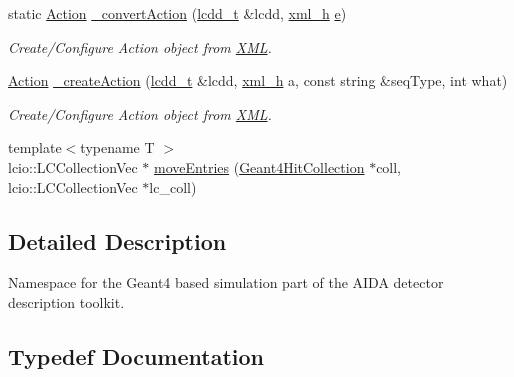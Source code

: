 \begin{DoxyCompactItemize}
static \hyperlink{namespace_d_d4hep_1_1_simulation_1_1_setup_aa958972310161bf099d9d22e59d257ab}{Action} \hyperlink{namespace_d_d4hep_1_1_simulation_a4a3e1d80b410fdc413e130d69c311891}{\+\_\+convert\+Action} (\hyperlink{namespace_d_d4hep_a9d7154801ec259f2a1d2fe015d140518}{lcdd\+\_\+t} \&lcdd, \hyperlink{_det_factory_helper_8h_ac13b3c79d2bc9214ff0cf5b8dc43dda6}{xml\+\_\+h} \hyperlink{_volumes_8cpp_a8a9a1f93e9b09afccaec215310e64142}{e})
\begin{DoxyCompactList}\small\item\em Create/\+Configure Action object from \hyperlink{namespace_d_d4hep_1_1_x_m_l}{X\+ML}. \end{DoxyCompactList}\item 
\hyperlink{namespace_d_d4hep_1_1_simulation_1_1_setup_aa958972310161bf099d9d22e59d257ab}{Action} \hyperlink{namespace_d_d4hep_1_1_simulation_a21f9fcaa27a71abd2beeabcba2600bda}{\+\_\+create\+Action} (\hyperlink{namespace_d_d4hep_a9d7154801ec259f2a1d2fe015d140518}{lcdd\+\_\+t} \&lcdd, \hyperlink{_det_factory_helper_8h_ac13b3c79d2bc9214ff0cf5b8dc43dda6}{xml\+\_\+h} a, const string \&seq\+Type, int what)
\begin{DoxyCompactList}\small\item\em Create/\+Configure Action object from \hyperlink{namespace_d_d4hep_1_1_x_m_l}{X\+ML}. \end{DoxyCompactList}\item 
{\footnotesize template$<$typename T $>$ }\\lcio\+::\+L\+C\+Collection\+Vec $\ast$ \hyperlink{namespace_d_d4hep_1_1_simulation_a55e61205dd2ea197dfb955e34c8dec6a}{move\+Entries} (\hyperlink{class_d_d4hep_1_1_simulation_1_1_geant4_hit_collection}{Geant4\+Hit\+Collection} $\ast$coll, lcio\+::\+L\+C\+Collection\+Vec $\ast$lc\+\_\+coll)
\end{DoxyCompactItemize}


\subsection{Detailed Description}
Namespace for the Geant4 based simulation part of the A\+I\+DA detector description toolkit. 

\subsection{Typedef Documentation}
\hypertarget{namespace_d_d4hep_1_1_simulation_a8700b6db44e003d9cf53ec35933063dc}{}\label{namespace_d_d4hep_1_1_simulation_a8700b6db44e003d9cf53ec35933063dc} 
